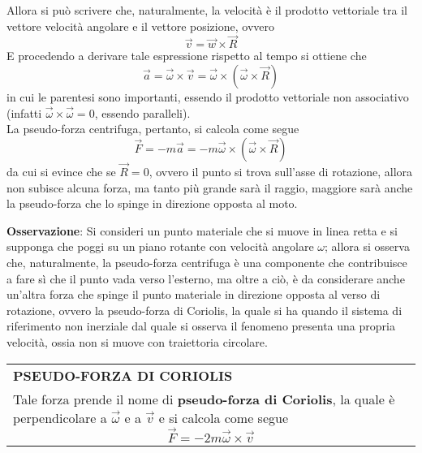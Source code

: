 \documentclass[a4paper]{extarticle}
\renewcommand\arraystretch{}
\begin{document}
\vspace{1em}
\noindent
Allora si può scrivere che, naturalmente, la velocità è il prodotto vettoriale tra il vettore velocità angolare e il vettore posizione, ovvero
\[\boxed{\vec v = \vec w \times \vec R}\]
E procedendo a derivare tale espressione rispetto al tempo si ottiene che
\[\boxed{\vec{a} = \vec{\omega} \times \vec{v} = \vec \omega \times \left(\vec \omega \times \vec R \right)}\]
in cui le parentesi sono importanti, essendo il prodotto vettoriale non associativo (infatti $\vec \omega \times \vec \omega = 0$, essendo paralleli).\\
La pseudo-forza centrifuga, pertanto,  si calcola come segue
\[\boxed{\vec F = -m \vec a = -m \vec \omega \times \left(\vec \omega \times \vec R \right)}\]
da cui si evince che se $\vec R = 0$, ovvero il punto si trova sull'asse di rotazione, allora non subisce alcuna forza, ma tanto più grande sarà il raggio, maggiore sarà anche la pseudo-forza che lo spinge in direzione opposta al moto.

\vspace{1em}
\noindent
\textbf{Osservazione}: Si consideri un punto materiale che si muove in linea retta e si supponga che poggi su un piano rotante con velocità angolare $\omega$; allora si osserva che, naturalmente, la pseudo-forza centrifuga è una componente che contribuisce a fare sì che il punto vada verso l'esterno, ma oltre a ciò, è da considerare anche un'altra forza che spinge il punto materiale in direzione opposta al verso di rotazione, ovvero la pseudo-forza di Coriolis, la quale si ha quando il sistema di riferimento non inerziale dal quale si osserva il fenomeno presenta una propria velocità, ossia non si muove con traiettoria circolare.

\vspace{1em}
\setlength{\tabcolsep}{14pt}
\renewcommand{\arraystretch}{2}
\noindent
\begin{tabularx}{\textwidth}{@{}|P|@{}}
    \hline
    {\textbf{PSEUDO-FORZA DI CORIOLIS}}\\
    \parbox{\linewidth}{Tale forza prende il nome di \textbf{pseudo-forza di Coriolis}, la quale è perpendicolare a $\vec \omega$ e a $\vec v$ e si calcola come segue
    \[\boxed{\vec F = -2 m \vec \omega \times \vec v}\]
    \vspace{-1mm}}\\
    \hline
\end{tabularx}
\end{document}
